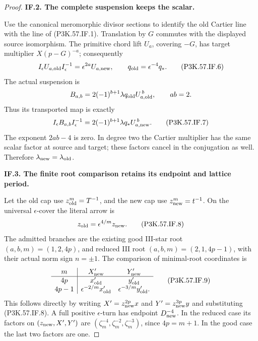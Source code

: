 \begin{proof}
\par\medskip\noindent\textbf{IF.2. The complete suspension keeps the scalar.}\par\nopagebreak[4]

Use the canonical meromorphic divisor sections to identify the old Cartier
line with the line of (P3K.57.IF.1). Translation by \(G\) commutes with the displayed
source isomorphism. The primitive chord lift \(U_a\), covering \(-G\), has
target multiplier \(X(p-G)^{-a}\); consequently
\[
 I_\epsilon U_{a,\rm old}I_\epsilon^{-1}
       =\epsilon^{2a}U_{a,\rm new},\qquad
 q_{\rm old}=\epsilon^{-4}q_* .                         \tag{P3K.57.IF.6}
\]
The actual suspension is
\[
 B_{a,b}=2(-1)^{b+1}\lambda q_{\rm old}U_{a,\rm old}^{\,b},
 \qquad ab=2 .
\]
Thus its transported map is exactly
\[
 I_\epsilon B_{a,b}I_\epsilon^{-1}
       =2(-1)^{b+1}\lambda q_*U_{a,\rm new}^{\,b}.       \tag{P3K.57.IF.7}
\]
The exponent \(2ab-4\) is zero. In degree two the Cartier multiplier has the
same scalar factor at source and target; these factors cancel in the
conjugation as well. Therefore \(\lambda_{\rm new}=\lambda_{\rm old}\).



\par\medskip\noindent\textbf{IF.3. The finite root comparison retains its endpoint and lattice period.}\par\nopagebreak[4]

Let the old cap use \(z_{\rm old}^m=T^{-1}\), and the new cap use
\(z_{\rm new}^m=t^{-1}\). On the universal \(\epsilon\)-cover the literal arrow is
\[
 z_{\rm old}=\epsilon^{4/m}z_{\rm new}.                 \tag{P3K.57.IF.8}
\]
The admitted branches are the existing good III-star root
\((a,b,m)=(1,2,4p)\), and reduced III root
\((a,b,m)=(2,1,4p-1)\), with their actual norm sign \(n=\pm1\).
The comparison of minimal-root coordinates is
\[
 \begin{array}{c|cc}
  m&X'_{\rm new}&Y'_{\rm new}\\ \hline
 4p&x'_{\rm old}&y'_{\rm old}\\
 4p-1&\epsilon^{-2/m}x'_{\rm old}&\epsilon^{-3/m}y'_{\rm old}.
 \end{array}                                           \tag{P3K.57.IF.9}
\]
This follows directly by writing \(X'=z_{\rm new}^{2p}x\) and
\(Y'=z_{\rm new}^{3p}y\) and substituting (P3K.57.IF.8). A full positive
\(\epsilon\)-turn has endpoint \(D_{\rm new}^{-4}\). In the reduced case its
factors on \((z_{\rm new},X',Y')\) are
\((\zeta_m^{-4},\zeta_m^{-2},\zeta_m^{-3})\), since \(4p=m+1\).
In the good case the last two factors are one.


\end{proof}
